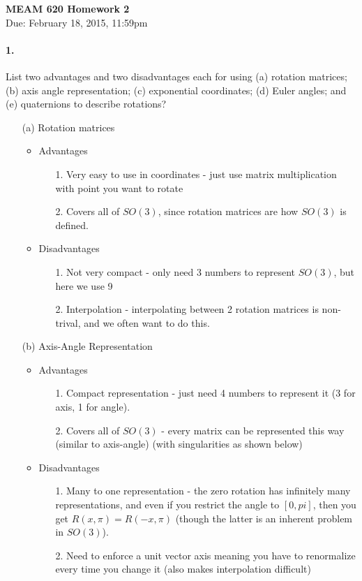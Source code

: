 \documentclass[english]{article}
\begin{document}
	
\begin{center}
{\textbf{MEAM 620 Homework 2}} \\
Due: February 18, 2015, 11:59pm
\end{center}


\paragraph{1.} List two advantages and two disadvantages each for using (a) rotation matrices;(b) axis angle representation; (c) exponential coordinates; (d) Euler angles; and (e) quaternions to describe rotations? 
\[\textrm{ }\]
\begin{enumerate}
 \item[(a)] Rotation matrices 
    \begin{itemize}
     \item Advantages
     \begin{enumerate}
      \item[1.] Very easy to use in coordinates - just use matrix multiplication with point you want to rotate
      \item[2.] Covers all of $SO(3)$, since rotation matrices are how $SO(3)$ is defined. 
     \end{enumerate}
     \item Disadvantages
     \begin{enumerate}
      \item[1.] Not very compact - only need 3 numbers to represent $SO(3)$, but here we use 9
      \item[2.] Interpolation - interpolating between 2 rotation matrices is non-trival, and we often want to do this.
     \end{enumerate}
    \end{itemize}

 \item[(b)] Axis-Angle Representation 
    \begin{itemize}
     \item Advantages
     \begin{enumerate}
      \item[1.] Compact representation - just need 4 numbers to represent it (3 for axis, 1 for angle). 
      \item[2.] Covers all of $SO(3)$ - every matrix can be represented this way (similar to axis-angle) (with singularities as shown below)
     \end{enumerate}
     \item Disadvantages
     \begin{enumerate}
      \item[1.] Many to one representation - the zero rotation has infinitely many representations,
                and even if you restrict the angle to $[0,pi]$, then you get $R(x,\pi) = R(-x,\pi)$
                (though the latter is an inherent problem in $SO(3)$). 
      \item[2.] Need to enforce a unit vector axis meaning you have to renormalize every time you change it (also makes interpolation difficult)
     \end{enumerate}
    \end{itemize}


\end{enumerate}
\end{document}
